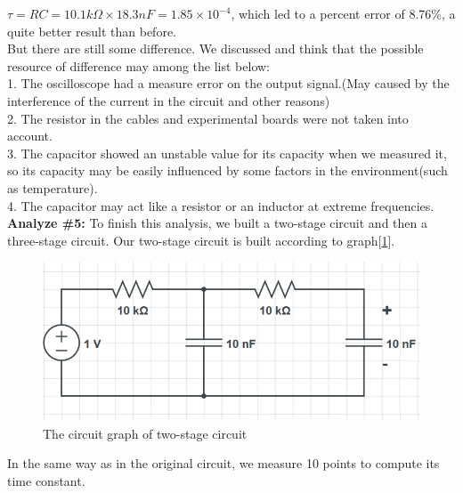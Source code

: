 $\tau = RC = 10.1k\Omega \times 18.3 nF = 1.85\times10^{-4}$, which led to a percent error of 8.76\%, a quite better result than before.\\
But there are still some difference. We discussed and think that the possible resource of difference may among the list below:\\
1. The oscilloscope had a measure error on the output signal.(May caused by the interference of the current in the circuit and other reasons)\\
2. The resistor in the cables and experimental boards were not taken into account.\\
3. The capacitor showed an unstable value for its capacity when we measured it, so its capacity may be easily influenced by some factors in the environment(such as temperature).\\
4. The capacitor may act like a resistor or an inductor at extreme frequencies.\\
\textbf{Analyze \#5:} \newline
\phantom{ } To finish this analysis, we built a two-stage circuit and then a three-stage circuit. Our two-stage circuit is built according to graph[\ref{fig:2.3}].\\
\begin{figure}[!htbp]
	\centering %
	\includegraphics[width=\linewidth]{images/2_3.PNG} %
	\caption{The circuit graph of two-stage circuit} %
	\label{fig:2.3} %
\end{figure}
\phantom{ } In the same way as in the original circuit, we measure 10 points to compute its time constant.
